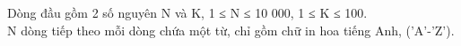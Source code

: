 Dòng đầu gồm 2 số nguyên N và K, 1 ≤ N ≤ 10 000, 1 ≤ K ≤ 100.   
\\   N dòng tiếp theo mỗi dòng chứa một từ, chỉ gồm chữ in hoa tiếng Anh, ('A'-'Z').